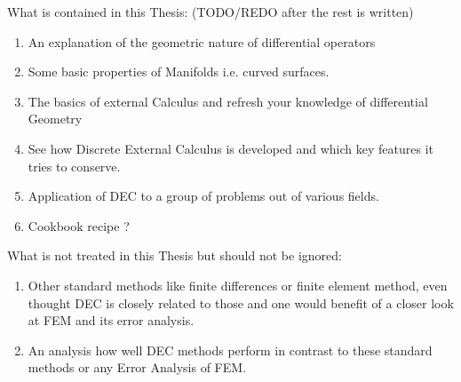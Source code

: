 What is contained in this Thesis: (TODO/REDO after the rest is written)
\begin{enumerate}
\item An explanation of the geometric nature of differential operators
\item Some basic properties of Manifolds i.e. curved surfaces.
\item The basics of external Calculus and refresh your knowledge of differential Geometry 
\item See how Discrete External Calculus is developed and which key features it tries to conserve.
\item Application of DEC to a group of problems out of various fields.
\item Cookbook recipe ?
\end{enumerate}
What is not treated in this Thesis but should not be ignored:
\begin{enumerate}
\item Other standard methods like finite differences or finite element method, even thought DEC is closely related to those and one would benefit of a closer look at FEM and its error analysis.
\item An analysis how well DEC methods perform in contrast to these standard methods or any Error Analysis of FEM.
\end{enumerate}